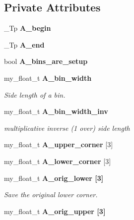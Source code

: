 \subsection*{Private Attributes}
\begin{CompactItemize}
\item 
\_\-Tp \textbf{A\_\-begin}\label{classSimSite3D_1_1point__bins_143c4437ed0bc651257efcfad94675da}

\item 
\_\-Tp \textbf{A\_\-end}\label{classSimSite3D_1_1point__bins_47b57104346abc683d5ab5158c42369d}

\item 
bool \textbf{A\_\-bins\_\-are\_\-setup}\label{classSimSite3D_1_1point__bins_7d80fecfcd4518db8d4a32cd093dfd4c}

\item 
my\_\-float\_\-t \bf{A\_\-bin\_\-width}\label{classSimSite3D_1_1point__bins_6ffd0913f0c0588e3c2ce19d1f4a96e3}

\begin{CompactList}\small\item\em Side length of a bin. \item\end{CompactList}\item 
my\_\-float\_\-t \bf{A\_\-bin\_\-width\_\-inv}\label{classSimSite3D_1_1point__bins_4fde2008e3f81fb68191c68127c20443}

\begin{CompactList}\small\item\em multiplicative inverse (1 over) side length \item\end{CompactList}\item 
my\_\-float\_\-t \textbf{A\_\-upper\_\-corner} [3]\label{classSimSite3D_1_1point__bins_313de0207d76bd11771307cf40f14729}

\item 
my\_\-float\_\-t \textbf{A\_\-lower\_\-corner} [3]\label{classSimSite3D_1_1point__bins_9ee31e608013306e3dd0416bd3813e84}

\item 
my\_\-float\_\-t \bf{A\_\-orig\_\-lower} [3]\label{classSimSite3D_1_1point__bins_274999e259918f2b0b5d3c2ba58435cb}

\begin{CompactList}\small\item\em Save the original lower corner. \item\end{CompactList}\item 
my\_\-float\_\-t \bf{A\_\-orig\_\-upper} [3]\label{classSimSite3D_1_1point__bins_6a3cf278675b515ed22a9bdfdf216784}


\end{CompactItemize}
